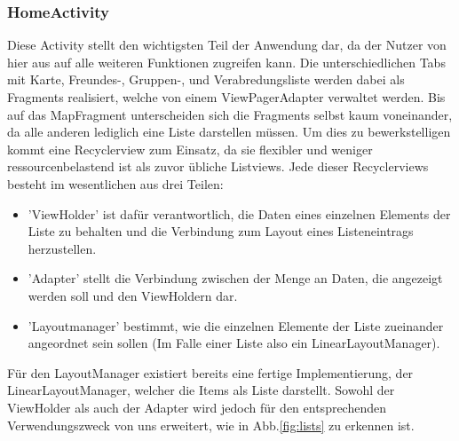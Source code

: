 \documentclass[parskip=full,11pt]{scrartcl}
\begin{document}
\subsubsection{HomeActivity}
Diese Activity stellt den wichtigsten Teil der Anwendung dar, da der Nutzer
von hier aus auf alle weiteren Funktionen zugreifen kann.
Die unterschiedlichen Tabs mit Karte, Freundes-, Gruppen-, und
Verabredungsliste werden dabei als Fragments realisiert, welche von einem
ViewPagerAdapter verwaltet werden. Bis auf das MapFragment unterscheiden sich
die Fragments selbst kaum voneinander, da alle anderen lediglich eine Liste
darstellen müssen. Um dies zu bewerkstelligen kommt eine Recyclerview zum
Einsatz, da sie flexibler und weniger ressourcenbelastend ist als zuvor
übliche Listviews. Jede dieser Recyclerviews besteht im wesentlichen aus
drei Teilen:
\begin{itemize}
	\item{'ViewHolder'} ist dafür verantwortlich, die Daten eines einzelnen
        Elements der Liste zu behalten und die Verbindung zum Layout eines
        Listeneintrags herzustellen.
	\item{'Adapter'} stellt die Verbindung zwischen der Menge an Daten, die
        angezeigt werden soll und den ViewHoldern dar.
	\item{'Layoutmanager'} bestimmt, wie die einzelnen Elemente der Liste
        zueinander angeordnet sein sollen
        (Im Falle einer Liste also ein LinearLayoutManager).
\end{itemize}
Für den LayoutManager existiert bereits eine fertige Implementierung, der
LinearLayoutManager, welcher die Items als Liste darstellt. Sowohl der
ViewHolder als auch der Adapter wird jedoch für den entsprechenden
Verwendungszweck von uns erweitert, wie in Abb.\ref{fig:lists} zu erkennen ist.
\end{document}
